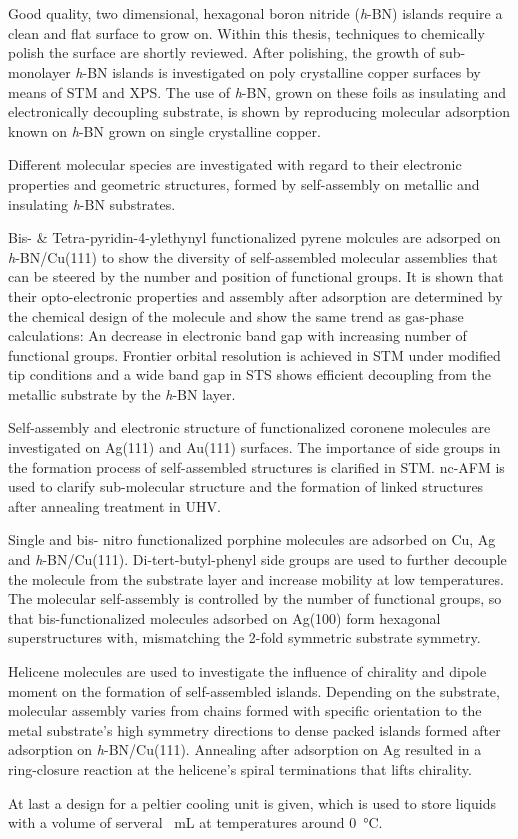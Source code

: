 \chapter{\abstractname}
Good quality, two dimensional, hexagonal boron nitride (\textit{h}-BN) islands require a clean and flat surface to grow on. Within this thesis, techniques to chemically polish the surface are shortly reviewed. After polishing, the growth of sub-monolayer \textit{h}-BN islands is investigated on poly crystalline copper surfaces by means of STM and XPS. The use of \textit{h}-BN, grown on these foils as insulating and electronically decoupling substrate, is shown by reproducing molecular adsorption known on \textit{h}-BN grown on single crystalline copper.

Different molecular species are investigated with regard to their electronic properties and geometric structures, formed by self-assembly on metallic and insulating \textit{h}-BN substrates.

Bis- \& Tetra-pyridin-4-ylethynyl functionalized pyrene molcules are adsorped on \textit{h}-BN/Cu(111) to show the diversity of self-assembled molecular assemblies that can be steered by the number and position of functional groups. It is shown that their opto-electronic properties and assembly after adsorption are determined by the chemical design of the molecule and show the same trend as gas-phase calculations: An decrease in electronic band gap with increasing number of functional groups. Frontier orbital resolution is achieved in STM under modified tip conditions and a wide band gap in STS shows efficient decoupling from the metallic substrate by the \textit{h}-BN layer. 

Self-assembly and electronic structure of functionalized coronene molecules are investigated on Ag(111) and Au(111) surfaces. The importance of side groups in the formation process of self-assembled structures is clarified in STM. nc-AFM is used to clarify sub-molecular structure and the formation of linked structures after annealing treatment in UHV.

Single and bis- nitro functionalized porphine molecules are adsorbed on Cu, Ag and \textit{h}-BN/Cu(111). Di-tert-butyl-phenyl side groups are used to further decouple the molecule from the substrate layer and increase mobility at low temperatures. The molecular self-assembly is controlled by the number of functional groups, so that bis-functionalized molecules adsorbed on Ag(100) form hexagonal superstructures with, mismatching the 2-fold symmetric substrate symmetry.
	
Helicene molecules are used to investigate the influence of chirality and dipole moment on the formation of self-assembled islands. Depending on the substrate, molecular assembly varies from chains formed with specific orientation to the metal substrate's high symmetry directions to dense packed islands formed after adsorption on \textit{h}-BN/Cu(111). Annealing after adsorption on Ag resulted in a ring-closure reaction at the helicene's spiral terminations that lifts chirality.

At last a design for a peltier cooling unit is given, which is used to store liquids with a volume of serveral \SI{}{\milli \liter} at temperatures around \SI{0}{\celsius}.